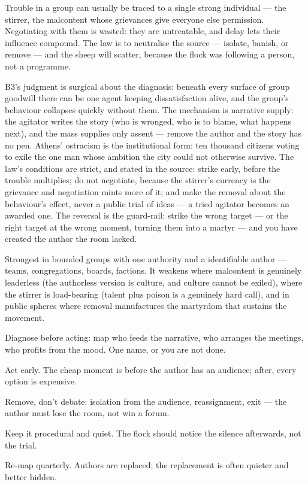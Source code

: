 \begin{core}
Trouble in a group can usually be traced to a single strong individual --- the stirrer, the malcontent whose grievances give everyone else permission. Negotiating with them is wasted: they are untreatable, and delay lets their influence compound. The law is to neutralise the source --- isolate, banish, or remove --- and the sheep will scatter, because the flock was following a person, not a programme.
\end{core}
\begin{mechanism}
B3's judgment is surgical about the diagnosis: beneath every surface of group goodwill there can be one agent keeping dissatisfaction alive, and the group's behaviour collapses quickly without them. The mechanism is narrative supply: the agitator writes the story (who is wronged, who is to blame, what happens next), and the mass supplies only assent --- remove the author and the story has no pen. Athens' ostracism is the institutional form: ten thousand citizens voting to exile the one man whose ambition the city could not otherwise survive. The law's conditions are strict, and stated in the source: strike early, before the trouble multiplies; do not negotiate, because the stirrer's currency is the grievance and negotiation mints more of it; and make the removal about the behaviour's effect, never a public trial of ideas --- a tried agitator becomes an awarded one. The reversal is the guard-rail: strike the wrong target --- or the right target at the wrong moment, turning them into a martyr --- and you have created the author the room lacked.
\end{mechanism}
\begin{conditions}
Strongest in bounded groups with one authority and a identifiable author --- teams, congregations, boards, factions. It weakens where malcontent is genuinely leaderless (the authorless version is culture, and culture cannot be exiled), where the stirrer is load-bearing (talent plus poison is a genuinely hard call), and in public spheres where removal manufactures the martyrdom that sustains the movement.
\end{conditions}
\begin{application}
  \item Diagnose before acting: map who feeds the narrative, who arranges the meetings, who profits from the mood. One name, or you are not done.
  \item Act early. The cheap moment is before the author has an audience; after, every option is expensive.
  \item Remove, don't debate: isolation from the audience, reassignment, exit --- the author must lose the room, not win a forum.
  \item Keep it procedural and quiet. The flock should notice the silence afterwards, not the trial.
  \item Re-map quarterly. Authors are replaced; the replacement is often quieter and better hidden.
\end{application}
